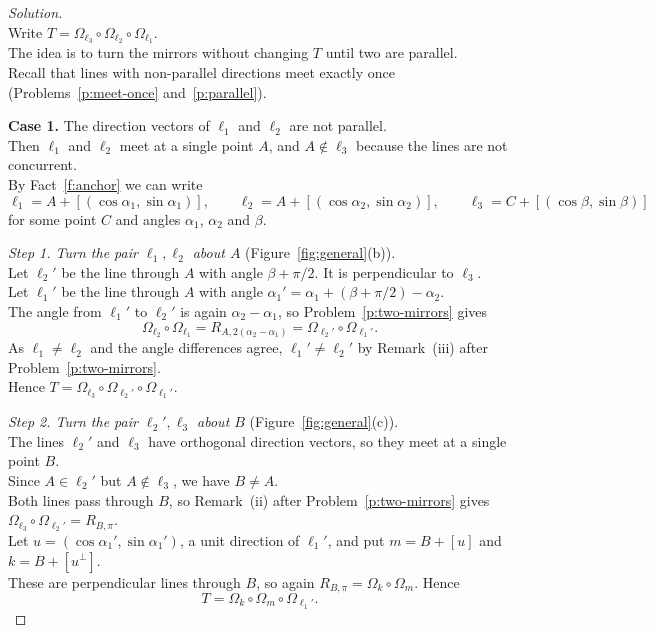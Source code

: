 \documentclass[11pt,a4paper]{article}
\theoremstyle{boxed}
\theoremstyle{definition}
\newenvironment{solution}{\begin{proof}[Solution]}{\end{proof}}
\begin{document}
\begin{solution}
\leavevmode\\
Write $T=\Omega_{\ell_3}\circ\Omega_{\ell_2}\circ\Omega_{\ell_1}$.\\
The idea is to turn the mirrors without changing $T$ until two are parallel.\\
Recall that lines with non-parallel directions meet exactly once (Problems~\ref{p:meet-once} and~\ref{p:parallel}).

\medskip\noindent
\textbf{Case 1.} The direction vectors of $\ell_1$ and $\ell_2$ are not parallel.\\
Then $\ell_1$ and $\ell_2$ meet at a single point $A$, and $A\notin\ell_3$ because the lines are not concurrent.\\
By Fact~\ref{f:anchor} we can write
\[
\ell_1=A+[(\cos\alpha_1,\sin\alpha_1)], \qquad
\ell_2=A+[(\cos\alpha_2,\sin\alpha_2)], \qquad
\ell_3=C+[(\cos\beta,\sin\beta)]
\]
for some point $C$ and angles $\alpha_1$, $\alpha_2$ and $\beta$.

\smallskip\noindent
\textit{Step 1. Turn the pair $\ell_1,\ell_2$ about $A$} (Figure~\ref{fig:general}(b)).\\
Let $\ell_2'$ be the line through $A$ with angle $\beta+\pi/2$. It is perpendicular to $\ell_3$.\\
Let $\ell_1'$ be the line through $A$ with angle $\alpha_1'=\alpha_1+(\beta+\pi/2)-\alpha_2$.\\
The angle from $\ell_1'$ to $\ell_2'$ is again $\alpha_2-\alpha_1$, so Problem~\ref{p:two-mirrors} gives
\[
\Omega_{\ell_2}\circ\Omega_{\ell_1}=R_{A,2(\alpha_2-\alpha_1)}=\Omega_{\ell_2'}\circ\Omega_{\ell_1'}.
\]
As $\ell_1\neq\ell_2$ and the angle differences agree, $\ell_1'\neq\ell_2'$ by Remark~(iii) after Problem~\ref{p:two-mirrors}.\\
Hence $T=\Omega_{\ell_3}\circ\Omega_{\ell_2'}\circ\Omega_{\ell_1'}$.

\smallskip\noindent
\textit{Step 2. Turn the pair $\ell_2',\ell_3$ about $B$} (Figure~\ref{fig:general}(c)).\\
The lines $\ell_2'$ and $\ell_3$ have orthogonal direction vectors, so they meet at a single point $B$.\\
Since $A\in\ell_2'$ but $A\notin\ell_3$, we have $B\neq A$.\\
Both lines pass through $B$, so Remark~(ii) after Problem~\ref{p:two-mirrors} gives $\Omega_{\ell_3}\circ\Omega_{\ell_2'}=R_{B,\pi}$.\\
Let $u=(\cos\alpha_1',\sin\alpha_1')$, a unit direction of $\ell_1'$, and put $m=B+[u]$ and $k=B+[u^\perp]$.\\
These are perpendicular lines through $B$, so again $R_{B,\pi}=\Omega_k\circ\Omega_m$. Hence
\[
T=\Omega_k\circ\Omega_m\circ\Omega_{\ell_1'}.
\]


\end{solution}
\end{document}
